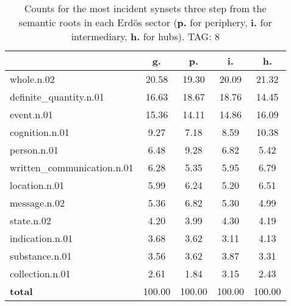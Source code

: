 \begin{table}[h!]
\begin{center}
\begin{tabular}{| l || c | c | c | c |}\hline
 & {\bf g.} & {\bf p.} & {\bf i.} & {\bf h.} \\\hline\hline
whole.n.02 & 20.58  & 19.30  & 20.09  & 21.32 \\\hline
definite\_quantity.n.01 & 16.63  & 18.67  & 18.76  & 14.45 \\\hline
event.n.01 & 15.36  & 14.11  & 14.86  & 16.09 \\\hline
cognition.n.01 & 9.27  & 7.18  & 8.59  & 10.38 \\\hline
person.n.01 & 6.48  & 9.28  & 6.82  & 5.42 \\\hline
written\_communication.n.01 & 6.28  & 5.35  & 5.95  & 6.79 \\\hline
location.n.01 & 5.99  & 6.24  & 5.20  & 6.51 \\\hline
message.n.02 & 5.36  & 6.82  & 5.30  & 4.99 \\\hline
state.n.02 & 4.20  & 3.99  & 4.30  & 4.19 \\\hline
indication.n.01 & 3.68  & 3.62  & 3.11  & 4.13 \\\hline
substance.n.01 & 3.56  & 3.62  & 3.87  & 3.31 \\\hline
collection.n.01 & 2.61  & 1.84  & 3.15  & 2.43 \\\hline\hline
{{\bf total}} & 100.00  & 100.00  & 100.00  & 100.00 \\\hline
\end{tabular}
\caption{Counts for the most incident synsets three step from the semantic roots in each Erd\"os sector ({\bf p.} for periphery, {\bf i.} for intermediary, {\bf h.} for hubs). TAG: 8}
\end{center}
\end{table}